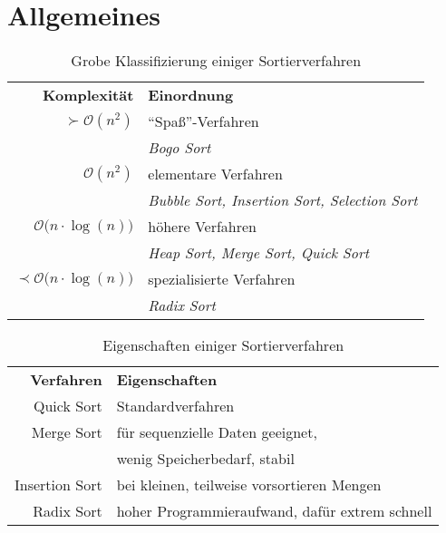 \section{Allgemeines}
\begin{table}[htb]
\centering
\begin{tabular}{rl}
	                      \bfseries Komplexität & \bfseries Einordnung                                       \\
	                    $\succ \mathcal O(n^2)$ & \enquote{Spaß}-Verfahren                                         \\
	                                            & \small\itshape Bogo Sort                                   \\
	                          $\mathcal O(n^2)$ & elementare Verfahren                                       \\
	                                            & \small\itshape Bubble Sort, Insertion Sort, Selection Sort \\
	      $\mathcal O\bigl(n\cdot\log(n)\bigr)$ & höhere Verfahren                                           \\
	                                            & \small\itshape Heap Sort, Merge Sort, Quick Sort           \\
	$\prec \mathcal O\bigl(n\cdot\log(n)\bigr)$ & spezialisierte Verfahren                                   \\
	                                            & \small\itshape Radix Sort
\end{tabular}

\caption{Grobe Klassifizierung einiger Sortierverfahren}
\end{table}

\begin{table}[htb]
\centering
\begin{tabular}{rl}
	\bfseries Verfahren & \bfseries Eigenschaften                        \\
	         Quick Sort & Standardverfahren                              \\
	         Merge Sort & für sequenzielle Daten geeignet,               \\
	                    & wenig Speicherbedarf, stabil                   \\
	     Insertion Sort & bei kleinen, teilweise vorsortieren Mengen     \\
	         Radix Sort & hoher Programmieraufwand, dafür extrem schnell
\end{tabular}

\caption{Eigenschaften einiger Sortierverfahren}
\end{table}

